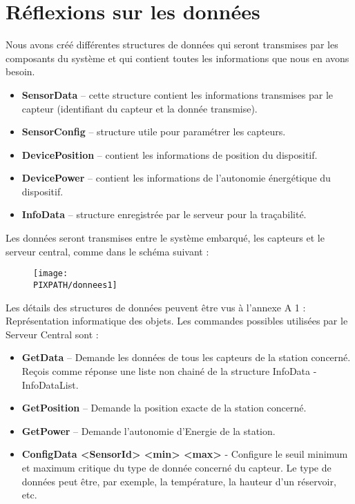 \section{Réflexions sur les données}

Nous avons créé différentes structures de données qui seront transmises par les composants du système et qui contient toutes les informations que nous en avons besoin. \\

\begin{itemize}
\item \textbf{SensorData} – cette structure contient les informations transmises par le capteur (identifiant du capteur et la donnée transmise).
\item \textbf{SensorConfig} –  structure utile pour paramétrer les capteurs.
\item \textbf{DevicePosition} – contient les informations de position du dispositif.
\item \textbf{DevicePower} – contient les informations de l’autonomie énergétique du dispositif.
\item \textbf{InfoData} – structure enregistrée par le serveur pour la traçabilité.
\end{itemize}

Les données seront transmises entre le système embarqué, les capteurs et le serveur central, comme dans le schéma suivant : \\

    \begin{figure}[!h]
    \begin{center}
    \texttt{[image: \\PIXPATH/donnees1]}
    \caption{}
    \end{center}
    \end{figure}

Les détails des structures de données peuvent être vus à  l’annexe A 1 : Représentation informatique des objets.
Les commandes possibles utilisées par le Serveur Central sont : \\

\begin{itemize}
\item \textbf{GetData} – Demande les données de tous les capteurs de la station concerné. Reçois comme réponse une liste non chainé de la structure InfoData  - InfoDataList.
\item \textbf{GetPosition} – Demande la position exacte de la station concerné.
\item \textbf{GetPower} – Demande l’autonomie d’Energie de la station.
\item \textbf{ConfigData <SensorId> <min> <max>} - Configure le seuil minimum et maximum critique du type de donnée concerné du capteur. Le type de données peut être, par exemple,  la température, la hauteur d’un réservoir, etc.
\end{itemize}

